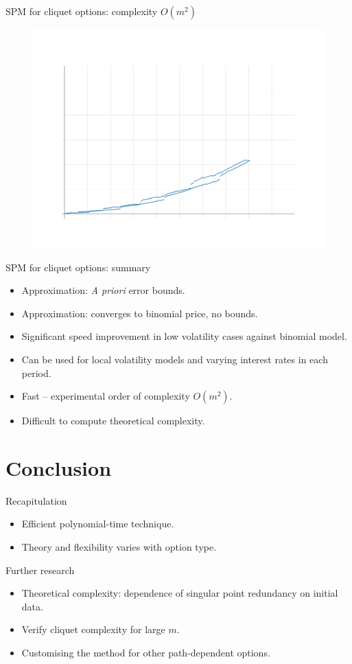 \documentclass[utf8,t,xcolor=svgnames]{beamer}
\newcommand\pro{\item[\textbf{\CheckedBox}]}
\newcommand\con{\item[\textbf{\XBox}]}
\begin{document}
\begin{frame}{SPM for cliquet options: complexity $ O(m^2) $}
	\begin{figure}
		\centering
		\includegraphics[height=0.75\textheight,width=\textwidth]{../img/timing-cliquet}
	\end{figure}
\end{frame}


\begin{frame}{SPM for cliquet options: summary}
	\begin{itemize}
		\pro Approximation: \emph{A priori} error bounds.
		\con<alert@1-> Approximation: converges to binomial price, no bounds.
		\pro Significant speed improvement in low volatility cases against binomial model.
		\pro<alert@1-> Can be used for local volatility models and varying interest rates in each period.
		\pro<alert@1-> Fast -- experimental order of complexity $ O(m^2) $.
		\con Difficult to compute theoretical complexity.
	\end{itemize}
\end{frame}


\section{Conclusion}

\begin{frame}{Recapitulation}
	\begin{itemize}
		\item Efficient polynomial-time technique.
		\item Theory and flexibility varies with option type.
	\end{itemize}
	
	Further research
	\begin{itemize}
		\item Theoretical complexity: dependence of singular point redundancy on initial data.
		\item Verify cliquet complexity for large $ m $.
		\item Customising the method for other path-dependent options.
	\end{itemize}
\end{frame}
\end{document}

